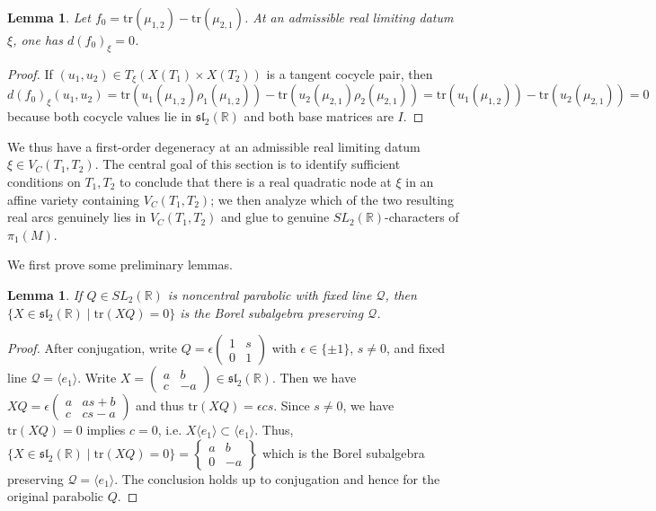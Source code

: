 \documentclass{article}
\newcommand{\sltwo}{\mathfrak{sl}_2}
\theoremstyle{plain}
\theoremstyle{definition}
\theoremstyle{plain}
\theoremstyle{plain}
\theoremstyle{plain}
\newtheorem{lemma}[theorem]{Lemma}
\theoremstyle{remark}
\theoremstyle{remark}
\theoremstyle{plain}
\theoremstyle{plain}
\theoremstyle{plain}
\theoremstyle{plain}
\begin{document}
\begin{lemma}\label{lma:identitytoidentity}
Let $f_0 = \mathrm{tr}(\mu_{1, 2}) - \mathrm{tr}(\mu_{2, 1})$. At an admissible real limiting datum $\xi$, one has $d(f_0)_\xi = 0$.
\end{lemma}

\begin{proof}
If $(u_1, u_2) \in T_\xi(X(T_1) \times X(T_2))$ is a tangent cocycle pair, then
\begin{equation*}
	d(f_0)_\xi(u_1, u_2) = \mathrm{tr}(u_1(\mu_{1, 2})\rho_1(\mu_{1, 2})) - \mathrm{tr}(u_2(\mu_{2, 1})\rho_2(\mu_{2, 1})) = \mathrm{tr}(u_1(\mu_{1, 2})) - \mathrm{tr}(u_2(\mu_{2, 1})) = 0
\end{equation*}
because both cocycle values lie in $\sltwo(\mathbb{R})$ and both base matrices are $I$.
\end{proof}

We thus have a first-order degeneracy at an admissible real limiting datum $\xi \in V_C(T_1, T_2)$. The central goal of this section is to identify sufficient conditions on $T_1, T_2$ to conclude that there is a real quadratic node at $\xi$ in an affine variety containing $V_C(T_1, T_2)$; we then analyze which of the two resulting real arcs genuinely lies in $V_C(T_1, T_2)$ and glue to genuine $SL_2(\mathbb{R})$-characters of $\pi_1(M)$.

\medskip

We first prove some preliminary lemmas. 

\begin{lemma}\label{lma:linalg}
If $Q \in SL_2(\mathbb{R})$ is noncentral parabolic with fixed line $\mathcal Q$, then $\{X \in \sltwo(\mathbb{R}) \mid \mathrm{tr}(XQ) = 0\}$ is the Borel subalgebra preserving $\mathcal Q$.
\end{lemma}

\begin{proof}
After conjugation, write $Q = \epsilon\left(\begin{smallmatrix} 1 & s \\ 0 & 1 \end{smallmatrix}\right)$ with $\epsilon \in \{\pm 1\}$, $s \neq 0$, and fixed line $\mathcal Q = \langle e_1 \rangle$. Write $X = \left(\begin{smallmatrix}a & b \\ c & -a\end{smallmatrix}\right) \in \sltwo(\mathbb{R})$. Then we have $XQ = \epsilon\left(\begin{smallmatrix}a&as+b\\c&cs-a\end{smallmatrix}\right)$ and thus $\mathrm{tr}(XQ) = \epsilon cs$. Since $s \neq 0$, we have $\mathrm{tr}(XQ) = 0$ implies $c = 0$, i.e. $X\langle e_1 \rangle \subset \langle e_1 \rangle$. Thus, $\{X \in \sltwo(\mathbb{R}) \mid \mathrm{tr}(XQ) = 0\} = \left\{\begin{smallmatrix}a & b \\ 0 & -a\end{smallmatrix}\right\}$ which is the Borel subalgebra preserving $\mathcal Q = \langle e_1 \rangle$. The conclusion holds up to conjugation and hence for the original parabolic $Q$. 
\end{proof}
\end{document}
